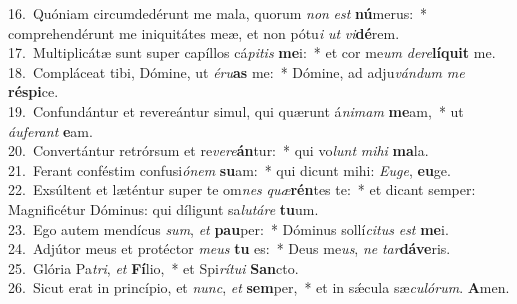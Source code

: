 {16.~}Quóniam circumdedérunt me mala, quorum \textit{non} \textit{est} \textbf{nú}merus:~* comprehendérunt me iniquitátes meæ, et non pótu\textit{i} \textit{ut} \textit{vi}\textbf{dé}rem.\\
{17.~}Multiplicátæ sunt super capíllos cá\textit{pi}\textit{tis} \textbf{me}i:~* et cor me\textit{um} \textit{de}\textit{re}\textbf{lí}\textbf{quit} me.\\
{18.~}Compláceat tibi, Dómine, ut \textit{é}\textit{ru}\textbf{as} me:~* Dómine, ad adju\textit{ván}\textit{dum} \textit{me} \textbf{ré}\textbf{spi}ce.\\
{19.~}Confundántur et revereántur simul, qui quærunt á\textit{ni}\textit{mam} \textbf{me}am,~* ut \textit{áu}\textit{fe}\textit{rant} \textbf{e}am.\\
{20.~}Convertántur retrórsum et re\textit{ve}\textit{re}\textbf{án}tur:~* qui vo\textit{lunt} \textit{mi}\textit{hi} \textbf{ma}la.\\
{21.~}Ferant conféstim confusi\textit{ó}\textit{nem} \textbf{su}am:~* qui dicunt mihi: \textit{E}\textit{u}\textit{ge}, \textbf{e}\textbf{u}ge.\\
{22.~}Exsúltent et læténtur super te om\textit{nes} \textit{quæ}\textbf{rén}tes te:~* et dicant semper: Magnificétur Dóminus: qui díligunt sa\textit{lu}\textit{tá}\textit{re} \textbf{tu}um.\\
{23.~}Ego autem mendícus \textit{sum}, \textit{et} \textbf{pau}per:~* Dóminus sollí\textit{ci}\textit{tus} \textit{est} \textbf{me}i.\\
{24.~}Adjútor meus et protéctor \textit{me}\textit{us} \textbf{tu} es:~* Deus me\textit{us}, \textit{ne} \textit{tar}\textbf{dá}\textbf{ve}ris.\\
{25.~}Glória Pa\textit{tri}, \textit{et} \textbf{Fí}lio,~* et Spi\textit{rí}\textit{tu}\textit{i} \textbf{San}cto.\\
{26.~}Sicut erat in princípio, et \textit{nunc}, \textit{et} \textbf{sem}per,~* et in sǽcula sæ\textit{cu}\textit{ló}\textit{rum}. \textbf{A}men.\\
